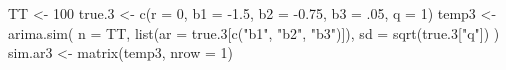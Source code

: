 \begin{Schunk}
\begin{Sinput}
 TT <- 100
 true.3 <- c(r = 0, b1 = -1.5, b2 = -0.75, b3 = .05, q = 1)
 temp3 <- arima.sim(
   n = TT, list(ar = true.3[c("b1", "b2", "b3")]),
   sd = sqrt(true.3["q"])
 )
 sim.ar3 <- matrix(temp3, nrow = 1)
\end{Sinput}
\end{Schunk}
